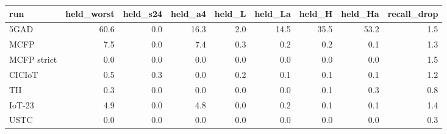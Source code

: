 \begin{tabular}{lrrrrrrrr}
\toprule
run & held\_worst & held\_s24 & held\_a4 & held\_L & held\_La & held\_H & held\_Ha & recall\_drop \\
\midrule
5GAD & 60.6 & 0.0 & 16.3 & 2.0 & 14.5 & 35.5 & 53.2 & 1.5 \\
MCFP & 7.5 & 0.0 & 7.4 & 0.3 & 0.2 & 0.2 & 0.1 & 1.3 \\
MCFP strict & 0.0 & 0.0 & 0.0 & 0.0 & 0.0 & 0.0 & 0.0 & 1.5 \\
CICIoT & 0.5 & 0.3 & 0.0 & 0.2 & 0.1 & 0.1 & 0.1 & 1.2 \\
TII & 0.3 & 0.0 & 0.0 & 0.0 & 0.0 & 0.1 & 0.3 & 0.8 \\
IoT-23 & 4.9 & 0.0 & 4.8 & 0.0 & 0.2 & 0.1 & 0.1 & 1.4 \\
USTC & 0.0 & 0.0 & 0.0 & 0.0 & 0.0 & 0.0 & 0.0 & 0.3 \\
\bottomrule
\end{tabular}
